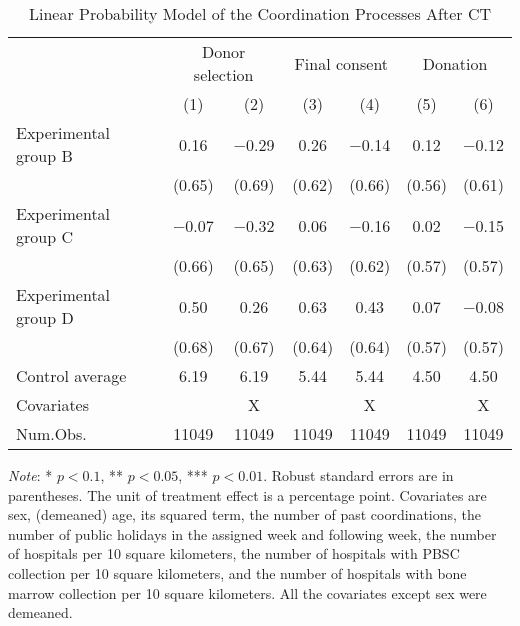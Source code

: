 \documentclass[12pt, a4paper]{article}
\begin{document}
\begin{table}
\centering\centering
\caption{\label{tab:lm-coordinate}Linear Probability Model of the Coordination Processes After CT}
\centering
\fontsize{8}{10}\selectfont
\begin{threeparttable}
\begin{tabular}[t]{lcccccc}
\toprule
\multicolumn{1}{c}{ } & \multicolumn{2}{c}{Donor selection} & \multicolumn{2}{c}{Final consent} & \multicolumn{2}{c}{Donation} \\
\cmidrule(l{3pt}r{3pt}){2-3} \cmidrule(l{3pt}r{3pt}){4-5} \cmidrule(l{3pt}r{3pt}){6-7}
  & (1) & (2) & (3) & (4) & (5) & (6)\\
\midrule
Experimental group B & \num{0.16} & \num{-0.29} & \num{0.26} & \num{-0.14} & \num{0.12} & \num{-0.12}\\
 & (\num{0.65}) & (\num{0.69}) & (\num{0.62}) & (\num{0.66}) & (\num{0.56}) & (\num{0.61})\\
Experimental group C & \num{-0.07} & \num{-0.32} & \num{0.06} & \num{-0.16} & \num{0.02} & \num{-0.15}\\
 & (\num{0.66}) & (\num{0.65}) & (\num{0.63}) & (\num{0.62}) & (\num{0.57}) & (\num{0.57})\\
Experimental group D & \num{0.50} & \num{0.26} & \num{0.63} & \num{0.43} & \num{0.07} & \num{-0.08}\\
 & (\num{0.68}) & (\num{0.67}) & (\num{0.64}) & (\num{0.64}) & (\num{0.57}) & (\num{0.57})\\
\midrule
Control average & 6.19 & 6.19 & 5.44 & 5.44 & 4.50 & 4.50\\
Covariates &  & X &  & X &  & X\\
Num.Obs. & \num{11049} & \num{11049} & \num{11049} & \num{11049} & \num{11049} & \num{11049}\\
\bottomrule
\end{tabular}
\begin{tablenotes}
\item \emph{Note}: * $p < 0.1$, ** $p < 0.05$, *** $p < 0.01$. Robust standard errors are in parentheses. The unit of treatment effect is a percentage point. Covariates are sex, (demeaned) age, its squared term, the number of past coordinations, the number of public holidays in the assigned week and following week, the number of hospitals per 10 square kilometers, the number of hospitals with PBSC collection per 10 square kilometers, and the number of hospitals with bone marrow collection per 10 square kilometers. All the covariates except sex were demeaned.
\end{tablenotes}
\end{threeparttable}
\end{table}
\end{document}
